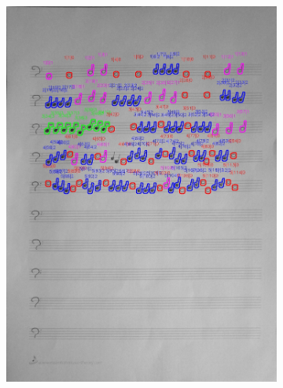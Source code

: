 \documentclass[11pt]{article}
\begin{document}
\begin{figure}[H]
\begin{subfigure}{.45\textwidth}
        \includegraphics[width=\linewidth]{8_cnts.jpg}
        \label{fig:sub2}
    \end{subfigure}
    \label{fig:test}
\end{figure}
\end{document}
